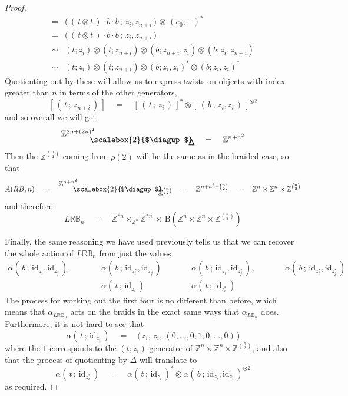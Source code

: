 \documentclass{amsbook} %
\newcommand{\id}{\textrm{id}}
\newcommand{\bigquotient}[2]{ \raisebox{0.75\height}{$#1$} \mkern-12mu\scalebox{2}{$\diagup$}\mkern-10mu \raisebox{-0.5\height}{$#2$} }
\numberwithin{section}{chapter}
\begin{document}
\begin{proof}
\[\begin{array}{rl}
			= & \big( \, ( \, t \otimes t \, ) \cdot b \cdot b \, ; \, z_i, z_{n+i} \, \big) \, \otimes \, (e_0 ; - )^* \\
			= & \big( \, ( \, t \otimes t \, ) \cdot b \cdot b \, ; \, z_i, z_{n+i} \, \big) \\
			\sim &  (t ; z_i) \otimes (t ; z_{n+i}) \otimes (b ;  z_{n+i}, z_i) \otimes (b ;  z_i, z_{n+i}) \\
			\sim & (t ; z_i) \otimes (t ; z_{n+i}) \otimes (b ;  z_i, z_i)^* \otimes (b;  z_i, z_i)^*
		\end{array}
\]
Quotienting out by these will allow us to express twists on objects with index greater than $n$ in terms of the other generators,
\[ [ \, ( \, t \, ; \, z_{n+i} \, ) \, ] \quad = \quad [ \, ( \, t \, ; \, z_i \, ) \, ]^* \otimes [ \, ( \, b \, ; \, z_i, z_i \, ) \, ]^{\otimes 2} \]
and so overall we will get
\[ \bigquotient{\mathbb{Z}^{2n + (2n)^2}}{\Delta} \quad = \quad \mathbb{Z}^{n + n^2} \]
Then the $\mathbb{Z}^{{n}\choose{2}}$ coming from $\rho(2)$ will be the same as in the braided case, so that
\[ A(RB,n) \quad = \quad \bigquotient{\mathbb{Z}^{n + n^2}}{\mathbb{Z}^{{n}\choose{2}}} \quad = \quad \mathbb{Z}^{n + n^2 - {{n}\choose{2}}} \quad = \quad \mathbb{Z}^{n} \times \mathbb{Z}^{n} \times \mathbb{Z}^{{n}\choose{2}} \]
and therefore
\[ L\mathbb{RB}_n \quad = \quad \mathbb{Z}^{\ast n} \times_{\mathbb{Z}^n} \mathbb{Z}^{\ast n}  \, \times \, \mathrm{B}(\mathbb{Z}^{n} \times \mathbb{Z}^{n} \times \mathbb{Z}^{{n}\choose{2}}) \]

Finally, the same reasoning we have used previously tells us that we can recover the whole action of $L\mathbb{RB}_n$ from just the values
\[ \begin{array}{ccccccc}
			\alpha( \, b \, ; \, \id_{z_i}, \id_{z_j} \, ), & \quad \quad & \alpha( \, b \, ; \, \id_{z_i^*}, \id_{z_j} \, ) & \quad \quad & \alpha( \, b \, ; \, \id_{z_i}, \id_{z_j^*} \, ), & \quad \quad & \alpha( \, b \, ; \, \id_{z_i^*}, \id_{z_j^*} \, ) \\
			& & \alpha( \, t \, ; \, \id_{z_i} \, ) & \quad \quad & \alpha( \, t \, ; \, \id_{z_i^*} \, ) & &
		\end{array}
\]
The process for working out the first four is no different than before, which means that $\alpha_{L\mathbb{RB}_n}$ acts on the braids in the exact same ways that $\alpha_{L\mathbb{B}_n}$ does. Furthermore, it is not hard to see that
\[ \alpha( \, t \, ; \, \id_{z_i} \, ) \quad = \quad \big( \, z_i, \, z_i, \, (0,\ldots,0, 1, 0,\ldots,0) \, \big) \]
where the $1$ corresponds to the $(t ; z_i)$ generator of $\mathbb{Z}^{n} \times \mathbb{Z}^{n} \times \mathbb{Z}^{{n}\choose{2}}$, and also that the process of quotienting by $\Delta$ will translate to 
\[ \alpha( \, t \, ; \, \id_{z_i^*} \, ) \quad = \quad \alpha( \, t \, ; \, \id_{z_i} \, )^* \otimes \alpha( \, b \, ; \, \id_{z_i}, \id_{z_i} \, )^{\otimes 2} \]
as required.
\end{proof}  
\end{document}
